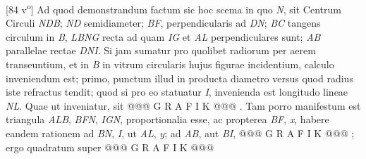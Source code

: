 [84 v\textsuperscript{o}]  Ad quod demonstrandum factum sic hoc scema in quo \textit{N},  sit Centrum Circuli \textit{NDB}; \textit{ND} semidiameter; \textit{BF},  perpendicularis ad \textit{DN}; \textit{BC} tangens circulum in \textit{B}, \textit{LBNG}  recta ad quam \textit{IG} et \textit{AL} perpendiculares sunt; \textit{AB}  parallelae rectae \textit{DNI}. Si jam  sumatur pro quolibet  radiorum per aerem transeuntium, et in \textit{B} in vitrum  circularis hujus figurae incidentium, calculo inveniendum  est; primo, punctum illud in producta diametro versus quod  radius iste refractus tendit; quod si pro eo statuatur \textit{I}, invenienda est longitudo lineae \textit{NL}. Quae ut inveniatur,  sit @@@ G R A F I K @@@%
                    . Tam  porro manifestum est triangula \textit{ALB}, \textit{BFN}, \textit{IGN}, proportionalia esse, ac propterea \textit{BF}, \textit{x}, habere eandem rationem  ad \textit{BN}, \textit{I}, ut \textit{AL}, \textit{y}; ad \textit{AB}, aut \textit{BI}, @@@ G R A F I K @@@%
                     ; ergo quadratum  super @@@ G R A F I K @@@%
